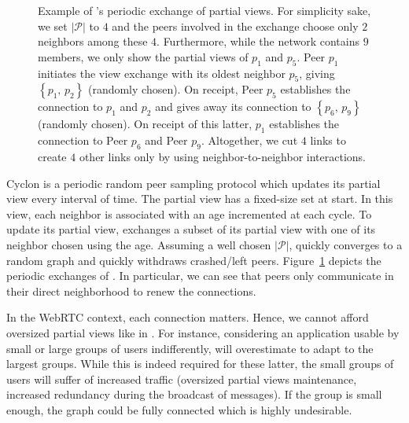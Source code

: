 \begin{figure}
  \centering
  
  \caption{\label{fig:cyclonexample}Example of \CYCLON{}'s periodic exchange of
    partial views. For simplicity sake, we set $|\mathcal{P}|$ to $4$ and the
    peers involved in the exchange choose only $2$ neighbors among these
    $4$. Furthermore, while the network contains $9$ members, we only show the
    partial views of $p_1$ and $p_5$.  Peer $p_1$ initiates the view exchange
    with its oldest neighbor $p_5$, giving $\left\{p_1,\,p_2\right\}$
    (randomly chosen). On receipt, Peer $p_5$ establishes the connection to
    $p_1$ and $p_2$ and gives away its connection to $\left\{p_6,\,p_9\right\}$
    (randomly chosen).  On receipt of this latter, $p_1$ establishes the
    connection to Peer $p_6$ and Peer $p_9$. Altogether, we cut $4$ links to
    create $4$ other links only by using neighbor-to-neighbor interactions.}
\end{figure}

\begin{asparadesc}
\item [Cyclon]\cite{voulgaris2005cyclon} is a periodic random peer sampling
  protocol which updates its partial view every interval of time. The partial
  view has a fixed-size set at start. In this view, each neighbor is
  associated with an age incremented at each cycle. To update its partial view,
  \CYCLON{} exchanges a subset of its partial view with one of its neighbor
  chosen using the age.  Assuming a well chosen $|\mathcal{P}|$, \CYCLON{}
  quickly converges to a random graph and quickly withdraws crashed/left peers.
  Figure~\ref{fig:cyclonexample} depicts the periodic exchanges of
  \CYCLON{}. In particular, we can see that peers only communicate in their
  direct neighborhood to renew the connections.

  In the WebRTC context, each connection matters. Hence, we cannot afford
  oversized partial views like in \CYCLON{}. For instance, considering an
  application usable by small or large groups of users indifferently, \CYCLON{}
  will overestimate to adapt to the largest groups. While this is indeed
  required for these latter, the small groups of users will suffer of increased
  traffic (oversized partial views maintenance, increased redundancy during the
  broadcast of messages). If the group is small enough, the graph could be
  fully connected which is highly undesirable.
\end{asparadesc}

